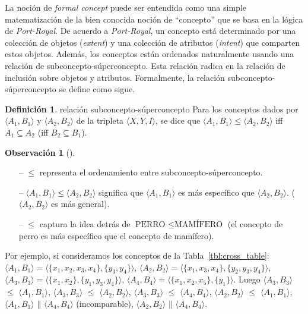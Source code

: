 \documentclass[12pt,oneside,letterpaper]{book}
\newcommand{\eng}[1]{\textit{#1}\xspace}			%
\newcommand{\formalconcept}[2]{$\langle #1,#2 \rangle$}
\newcommand{\formalconceptext}[4]{$\langle #1,#2 \rangle = \langle\{#3\},\{#4\}\rangle$}
\newcommand{\parallelbars}{\mathbin{\|}}
\theoremstyle{definition}
\newtheorem{definition}{Definición}[section]
\newtheorem{remark}{Observación}[section]
\begin{document}
La noción de \eng{formal concept} puede ser entendida como una simple matematización de la bien conocida noción de ``concepto'' que se basa en la lógica de \eng{Port-Royal}. De acuerdo a \eng{Port-Royal}, un concepto está determinado por una colección de objetos (\eng{extent}) y una colección de atributos (\eng{intent}) que comparten estos objetos. Además, los conceptos están ordenados naturalmente usando una relación de subconcepto-súperconcepto. Esta relación radica en la relación de inclusión sobre objetos y atributos. Formalmente, la relación subconcepto-súperconcepto se define como sigue. 

\begin{definition}{relación subconcepto-súperconcepto}
Para los conceptos dados por $\langle A_1,B_1 \rangle$ y $\langle A_2, B_2 \rangle$ de la tripleta $\langle X,Y,I \rangle$, se dice que $\langle A_1,B_1 \rangle \le \langle A_2,B_2 \rangle$ iff $A_1 \subseteq A_2$ (iff $B_2 \subseteq B_1$).
\end{definition}
\begin{remark}[]
	\begin{itemize}
		\item[--] $\le$ representa el ordenamiento entre subconcepto-súperconcepto.
		\item[--] $\langle A_1,B_1 \rangle \le \langle A_2,B_2 \rangle$ significa que $\langle A_1,B_1 \rangle$ es más específico que $\langle A_2,B_2 \rangle$. ($\langle A_2,B_2 \rangle$ es más general).
		\item[--] $\le$ captura la idea detrás de $\text{PERRO } \le \text{MAMÍFERO}$ (el concepto de perro es más específico que el concepto de mamífero). 
	\end{itemize}
\end{remark}

Por ejemplo, si consideramos los conceptos de la Tabla~\ref{tbl:cross_table}: \\ \formalconceptext{A_1}{B_1}{x_1,x_2,x_3,x_4}{y_3,y_4}, \formalconceptext{A_2}{B_2}{x_1,x_3,x_4}{y_2,y_3,y_4}, \formalconceptext{A_3}{B_3}{x_1,x_2}{y_1,y_3,y_4}, \formalconceptext{A_4}{B_4}{x_1,x_2,x_5}{y_1}. Luego \formalconcept{A_3}{B_3} $\le$ \formalconcept{A_1}{B_1}, \formalconcept{A_3}{B_3} $\le$ \formalconcept{A_2}{B_2}, \formalconcept{A_3}{B_3} $\le$ \formalconcept{A_4}{B_4}, \formalconcept{A_2}{B_2} $\le$ \formalconcept{A_1}{B_1}, \formalconcept{A_1}{B_1} $\parallelbars$ \formalconcept{A_4}{B_4} (incomparable), \formalconcept{A_2}{B_2} $\parallelbars$ \formalconcept{A_4}{B_4}.
\end{document}
